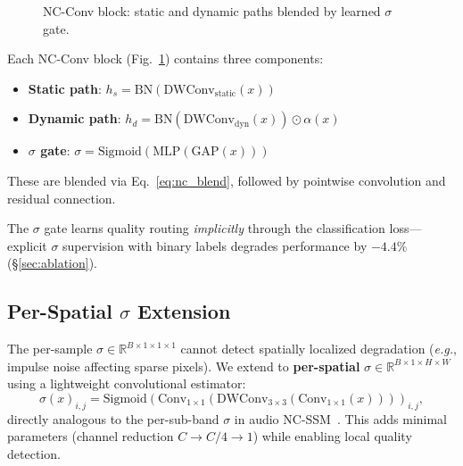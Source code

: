 \documentclass[runningheads]{llncs}
\newcommand{\eg}{\emph{e.g.}}
\begin{document}
\begin{figure}[t]
{%
}
\caption{NC-Conv block: \textcolor{fixcolor}{static} and \textcolor{dyncolor}{dynamic} paths blended by learned $\sigma$ gate.}
\label{fig:ncconv}
\end{figure}

Each NC-Conv block (Fig.~\ref{fig:ncconv}) contains three components:
\begin{itemize}
\setlength\itemsep{0pt}
\item \textbf{Static path}: $h_s = \text{BN}(\text{DWConv}_{\text{static}}(x))$
\item \textbf{Dynamic path}: $h_d = \text{BN}(\text{DWConv}_{\text{dyn}}(x)) \odot \alpha(x)$
\item \textbf{$\sigma$ gate}: $\sigma = \text{Sigmoid}(\text{MLP}(\text{GAP}(x)))$
\end{itemize}
These are blended via Eq.~\ref{eq:nc_blend}, followed by pointwise convolution and residual connection.

The $\sigma$ gate learns quality routing \emph{implicitly} through the classification loss---explicit $\sigma$ supervision with binary labels degrades performance by $-4.4\%$ (\S\ref{sec:ablation}).


\subsection{Per-Spatial $\sigma$ Extension}
\label{sec:spatial_sigma}

The per-sample $\sigma \in \mathbb{R}^{B \times 1 \times 1 \times 1}$ cannot detect spatially localized degradation (\eg, impulse noise affecting sparse pixels).
We extend to \textbf{per-spatial} $\sigma \in \mathbb{R}^{B \times 1 \times H \times W}$ using a lightweight convolutional estimator:
\begin{equation}
\sigma(x)_{i,j} = \text{Sigmoid}(\text{Conv}_{1\times1}(\text{DWConv}_{3\times3}(\text{Conv}_{1\times1}(x))))_{i,j},
\end{equation}
directly analogous to the per-sub-band $\sigma$ in audio NC-SSM~\cite{choi2026ncssm}.
This adds minimal parameters (channel reduction $C \to C/4 \to 1$) while enabling local quality detection.
\end{document}
